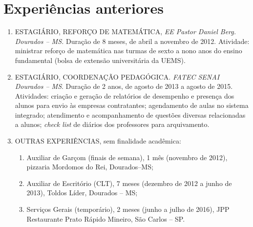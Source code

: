 \documentclass[11pt]{article}
\begin{document}
\section{Experiências anteriores \dotfill}
\begin{enumerate}
\item ESTAGIÁRIO, REFORÇO DE MATEMÁTICA, \textit{EE Pastor Daniel Berg. Dourados -- MS.} Duração de 8 meses, de abril a novembro de 2012. Atividade: ministrar reforço de matemática nas turmas de sexto a nono anos do ensino fundamental (bolsa de extensão universitária da UEMS).

\item ESTAGIÁRIO, COORDENAÇÃO PEDAGÓGICA. {\it FATEC SENAI Dourados -- MS}. Duração de 2 anos, de agosto de 2013 a agosto de 2015. Atividades: criação e geração de relatórios de desempenho e presença dos alunos para envio às empresas contratantes; agendamento de aulas no sistema integrado; atendimento e acompanhamento de questões diversas relacionadas a alunos; {\it check list} de diários dos professores para arquivamento. 


\item OUTRAS EXPERIÊNCIAS, sem finalidade acadêmica:
\begin{enumerate}
\item  Auxiliar de Garçom (finais de semana), 1 mês (novembro de 2012), pizzaria Mordomos do Rei, Dourados--MS;
\item Auxiliar de Escritório (CLT), 7 meses (dezembro de 2012 a junho de 2013), Toldos Líder, Dourados -- MS;
\item  Serviços Gerais (temporário), 2 meses (junho a julho de 2016), JPP Restaurante Prato Rápido Mineiro, São Carlos -- SP.
\end{enumerate}
\end{enumerate}
\end{document}
